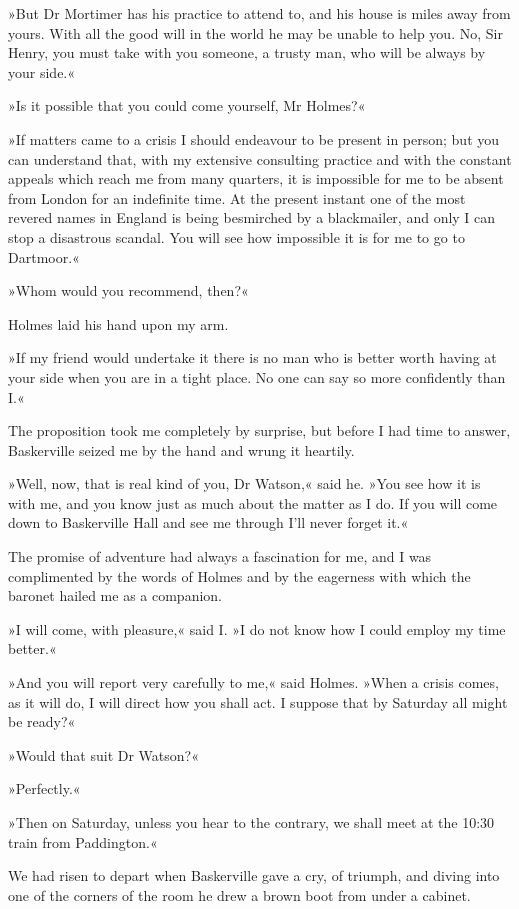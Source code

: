 »But Dr Mortimer has his practice to attend to, and his house is miles away from yours. With all the good will in the world he may be unable to help you. No, Sir Henry, you must take with you someone, a trusty man, who will be always by your side.«

»Is it possible that you could come yourself, Mr Holmes?«

»If matters came to a crisis I should endeavour to be present in person; but you can understand that, with my extensive consulting practice and with the constant appeals which reach me from many quarters, it is impossible for me to be absent from London for an indefinite time. At the present instant one of the most revered names in England is being besmirched by a blackmailer, and only I can stop a disastrous scandal. You will see how impossible it is for me to go to Dartmoor.«

»Whom would you recommend, then?«

Holmes laid his hand upon my arm.

»If my friend would undertake it there is no man who is better worth having at your side when you are in a tight place. No one can say so more confidently than I.«

The proposition took me completely by surprise, but before I had time to answer, Baskerville seized me by the hand and wrung it heartily.

»Well, now, that is real kind of you, Dr Watson,« said he. »You see how it is with me, and you know just as much about the matter as I do. If you will come down to Baskerville Hall and see me through I'll never forget it.«

The promise of adventure had always a fascination for me, and I was complimented by the words of Holmes and by the eagerness with which the baronet hailed me as a companion.

»I will come, with pleasure,« said I. »I do not know how I could employ my time better.«

»And you will report very carefully to me,« said Holmes. »When a crisis comes, as it will do, I will direct how you shall act. I suppose that by Saturday all might be ready?«

»Would that suit Dr Watson?«

»Perfectly.«

»Then on Saturday, unless you hear to the contrary, we shall meet at the 10:30 train from Paddington.«

We had risen to depart when Baskerville gave a cry, of triumph, and diving into one of the corners of the room he drew a brown boot from under a cabinet.

